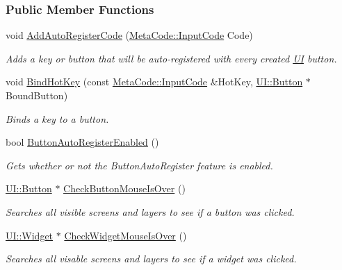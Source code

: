 \subsubsection*{Public Member Functions}
\begin{DoxyCompactItemize}
\item 
void \hyperlink{classMezzanine_1_1UIManager_a79796c009d0481370bd66d7006016776}{AddAutoRegisterCode} (\hyperlink{classMezzanine_1_1MetaCode_a3b5633f0145bf3287cf53a3f05b5563c}{MetaCode::InputCode} Code)
\begin{DoxyCompactList}\small\item\em Adds a key or button that will be auto-\/registered with every created \hyperlink{namespaceMezzanine_1_1UI}{UI} button. \item\end{DoxyCompactList}\item 
void \hyperlink{classMezzanine_1_1UIManager_aa4f168f84cc9ab88d04964913b3982f3}{BindHotKey} (const \hyperlink{classMezzanine_1_1MetaCode_a3b5633f0145bf3287cf53a3f05b5563c}{MetaCode::InputCode} \&HotKey, \hyperlink{classMezzanine_1_1UI_1_1Button}{UI::Button} $\ast$BoundButton)
\begin{DoxyCompactList}\small\item\em Binds a key to a button. \item\end{DoxyCompactList}\item 
bool \hyperlink{classMezzanine_1_1UIManager_a7e88a8d25ae95440032333179f2f493f}{ButtonAutoRegisterEnabled} ()
\begin{DoxyCompactList}\small\item\em Gets whether or not the ButtonAutoRegister feature is enabled. \item\end{DoxyCompactList}\item 
\hyperlink{classMezzanine_1_1UI_1_1Button}{UI::Button} $\ast$ \hyperlink{classMezzanine_1_1UIManager_ae4ad1d9ca321006a995c530a0debe835}{CheckButtonMouseIsOver} ()
\begin{DoxyCompactList}\small\item\em Searches all visible screens and layers to see if a button was clicked. \item\end{DoxyCompactList}\item 
\hyperlink{classMezzanine_1_1UI_1_1Widget}{UI::Widget} $\ast$ \hyperlink{classMezzanine_1_1UIManager_ab12c172934cb6836e97568266d973e50}{CheckWidgetMouseIsOver} ()
\begin{DoxyCompactList}\small\item\em Searches all visable screens and layers to see if a widget was clicked. \item\end{DoxyCompactList}\item 

\end{DoxyCompactItemize}
